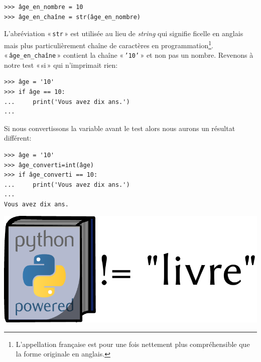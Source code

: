 \begin{Verbatim}[frame=single,rulecolor=\color{mbleu}, label=à taper]
>>> âge_en_nombre = 10
>>> âge_en_chaîne = str(âge_en_nombre)
\end{Verbatim}

L'abréviation « \texttt{str} » est utilisée au lieu de \emph{string} qui signifie ficelle en anglais mais plus particulièrement chaîne de caractères en programmation\footnote{L'appellation française est pour une fois nettement plus compréhensible que la forme originale en anglais.}.\\

« \texttt{âge\_en\_chaîne} » contient la chaîne « \texttt{'10'} » et non pas un nombre. Revenons à notre test « si » qui n'imprimait rien:

\begin{Verbatim}[frame=single,rulecolor=\color{green}, label=à taper avec attention]
>>> âge = '10'
>>> if âge == 10:
...     print('Vous avez dix ans.')
...
\end{Verbatim}

Si nous convertissons la variable avant le test alors nous aurons un résultat différent:

\begin{Verbatim}[frame=single,rulecolor=\color{green}, label=à taper avec attention]
>>> âge = '10'
>>> âge_converti=int(âge)
>>> if âge_converti == 10:
...     print('Vous avez dix ans.')
...
Vous avez dix ans.
\end{Verbatim}

\vfill
\begin{center}
\includegraphics[scale=1]{images/livre.pdf} 
\end{center}
\vfill

\clearemptydoublepage